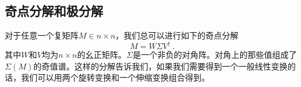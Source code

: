 


\subsection{奇点分解和极分解}
对于任意一个复矩阵$M\in n\times n$，我们总可以进行如下的奇点分解
\begin{equation}
M=W \Sigma V^{\dagger}~.
\end{equation}
其中$W$和$V$均为$n\times n$的幺正矩阵。$\Sigma$是一个非负的对角阵。对角上的那些值组成了$\Sigma(M)$的奇值谱。这样的分解告诉我们，如果我们需要得到一个一般线性变换的话，我们可以用两个旋转变换和一个伸缩变换组合得到。



